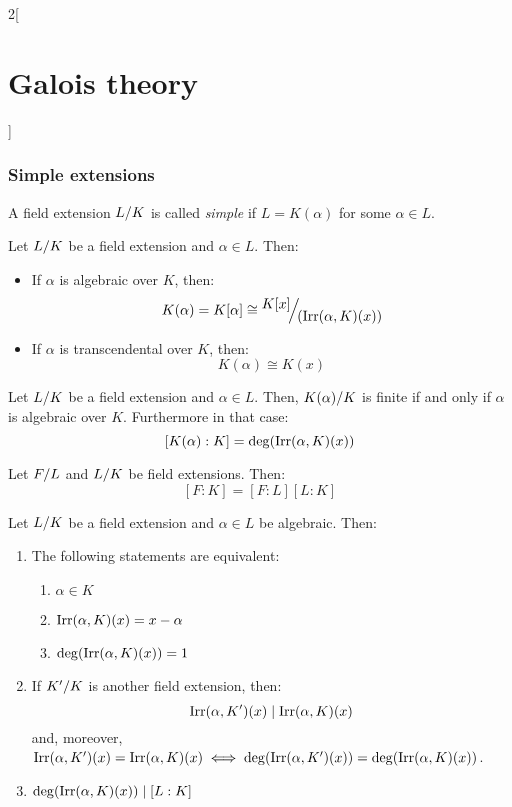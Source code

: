 \documentclass[../../../main.tex]{subfiles}
\begin{document}
\begin{multicols}{2}[\section{Galois theory}]
  \subsubsection{Simple extensions}
  \begin{definition}
    A field extension $\quot{L}{K}$ is called \textit{simple} if $L=K(\alpha)$ for some $\alpha\in L$.
  \end{definition}
  \begin{prop}
    Let $\quot{L}{K}$ be a field extension and $\alpha\in L$. Then:
    \begin{itemize}
      \item If $\alpha$ is algebraic over $K$, then: $$K(\alpha)=K[\alpha]\cong\quot{K[x]}{(\irr(\alpha,K)(x))}$$
      \item If $\alpha$ is transcendental over $K$, then: $$K(\alpha)\cong K(x)$$
    \end{itemize}
  \end{prop}
  \begin{corollary}
    Let $\quot{L}{K}$ be a field extension and $\alpha\in L$. Then, $\quot{K(\alpha)}{K}$ is finite if and only if $\alpha$ is algebraic over $K$. Furthermore in that case: $$[K(\alpha):K]=\deg(\operatorname{Irr}(\alpha,K)(x))$$
  \end{corollary}
  \begin{theorem}
    Let $\quot{F}{L}$ and $\quot{L}{K}$ be field extensions. Then: $$[F:K]=[F:L][L:K]$$
  \end{theorem}
  \begin{prop}
    Let $\quot{L}{K}$ be a field extension and $\alpha\in L$ be algebraic. Then:
    \begin{enumerate}
      \item The following statements are equivalent:
            \begin{enumerate}
              \item $\alpha\in K$
              \item $\operatorname{Irr}(\alpha,K)(x)=x-\alpha$
              \item $\deg(\operatorname{Irr}(\alpha,K)(x))=1$
            \end{enumerate}
      \item If $\quot{K'}{K}$ is another field extension, then: $$\operatorname{Irr}(\alpha,K')(x)\mid\operatorname{Irr}(\alpha,K)(x)$$ and, moreover, $\operatorname{Irr}(\alpha,K')(x)=\operatorname{Irr}(\alpha,K)(x)\iff\deg(\operatorname{Irr}(\alpha,K')(x))=\deg(\operatorname{Irr}(\alpha,K)(x))$.
      \item $\deg(\operatorname{Irr}(\alpha,K)(x))\mid [L:K]$
    \end{enumerate}

\end{prop}
\end{multicols}
\end{document}
